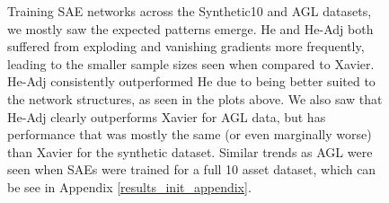 \documentclass[a4paper,11pt,oneside]{article}
\theoremstyle{plain}
\theoremstyle{definition}
\begin{document}
\begin{figure}[H]
{			\newline Training SAE networks across the Synthetic10 and AGL  datasets, we mostly saw the expected patterns emerge. He and He-Adj both suffered from exploding and vanishing gradients more frequently, leading to the smaller sample sizes seen when compared to Xavier. He-Adj consistently outperformed He due to being better suited to the network structures, as seen in the plots above. We also saw that He-Adj clearly outperforms Xavier for AGL data, but has performance that was mostly the same (or even marginally worse) than Xavier for the synthetic dataset. Similar trends as AGL were seen when SAEs were trained for a full 10 asset dataset, which can be see in Appendix \ref{results_init_appendix}.}
		\label{figure-mse_init}
	\end{figure}
	
\end{document}
